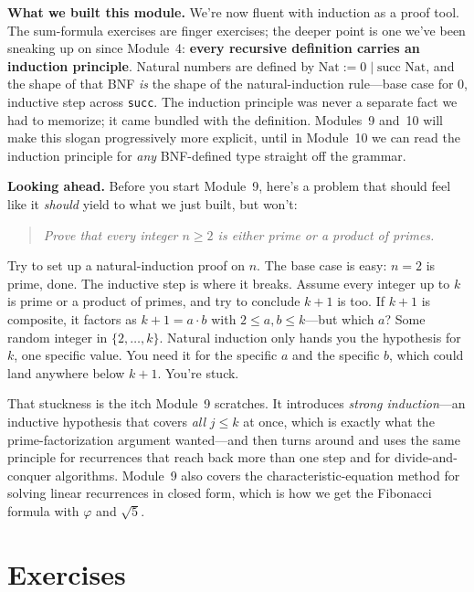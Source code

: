 \documentclass[11pt]{article}
\begin{document}
\begin{summarybox}
\textbf{What we built this module.} We're now fluent with induction as a proof tool. The sum-formula exercises are finger exercises; the deeper point is one we've been sneaking up on since Module~4: \textbf{every recursive definition carries an induction principle}. Natural numbers are defined by $\text{Nat} := 0 \mid \text{succ Nat}$, and the shape of that BNF \emph{is} the shape of the natural-induction rule---base case for $0$, inductive step across \texttt{succ}. The induction principle was never a separate fact we had to memorize; it came bundled with the definition. Modules~9 and~10 will make this slogan progressively more explicit, until in Module~10 we can read the induction principle for \emph{any} BNF-defined type straight off the grammar.

\medskip
\textbf{Looking ahead.} Before you start Module~9, here's a problem that should feel like it \emph{should} yield to what we just built, but won't:

\begin{quote}
\emph{Prove that every integer $n \geq 2$ is either prime or a product of primes.}
\end{quote}

Try to set up a natural-induction proof on $n$. The base case is easy: $n = 2$ is prime, done. The inductive step is where it breaks. Assume every integer up to $k$ is prime or a product of primes, and try to conclude $k+1$ is too. If $k+1$ is composite, it factors as $k+1 = a \cdot b$ with $2 \leq a, b \leq k$---but which $a$? Some random integer in $\{2, \ldots, k\}$. Natural induction only hands you the hypothesis for $k$, one specific value. You need it for the specific $a$ and the specific $b$, which could land anywhere below $k+1$. You're stuck.

\medskip
That stuckness is the itch Module~9 scratches. It introduces \emph{strong induction}---an inductive hypothesis that covers \emph{all} $j \leq k$ at once, which is exactly what the prime-factorization argument wanted---and then turns around and uses the same principle for recurrences that reach back more than one step and for divide-and-conquer algorithms. Module~9 also covers the characteristic-equation method for solving linear recurrences in closed form, which is how we get the Fibonacci formula with $\varphi$ and $\sqrt{5}$.
\end{summarybox}

\section{Exercises}
\end{document}
